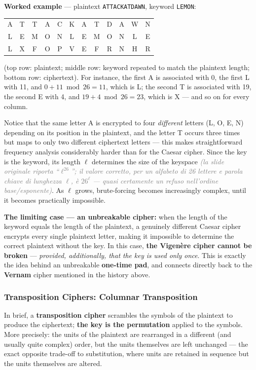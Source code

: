 \documentclass[12pt, a4paper]{article}
\begin{document}
\textbf{Worked example} --- plaintext \texttt{ATTACKATDAWN}, keyword \texttt{LEMON}:
\begin{center}
\begin{tabular}{@{}cccccccccccc@{}}
\toprule
A & T & T & A & C & K & A & T & D & A & W & N \\
L & E & M & O & N & L & E & M & O & N & L & E \\
\midrule
L & X & F & O & P & V & E & F & R & N & H & R \\
\bottomrule
\end{tabular}
\end{center}
(top row: plaintext; middle row: keyword repeated to match the plaintext length; bottom row: ciphertext). For instance, the first A is associated with 0, the first L with 11, and $0+11 \bmod 26 = 11$, which is L; the second T is associated with 19, the second E with 4, and $19+4 \bmod 26 = 23$, which is X — and so on for every column.

Notice that the same letter A is encrypted to four \emph{different} letters (L, O, E, N) depending on its position in the plaintext, and the letter T occurs three times but maps to only two different ciphertext letters — this makes straightforward frequency analysis considerably harder than for the Caesar cipher. Since the key is the keyword, its length $\ell$ determines the size of the keyspace \textcolor{gray}{\textit{(la slide originale riporta ``$\ell^{26}$''; il valore corretto, per un alfabeto di 26 lettere e parola chiave di lunghezza $\ell$, è $26^{\ell}$ --- quasi certamente un refuso nell'ordine base/esponente)}}. As $\ell$ grows, brute-forcing becomes increasingly complex, until it becomes practically impossible.

\textbf{The limiting case --- an unbreakable cipher:} when the length of the keyword equals the length of the plaintext, a genuinely different Caesar cipher encrypts every single plaintext letter, making it impossible to determine the correct plaintext without the key. In this case, \textbf{the Vigenère cipher cannot be broken} --- \emph{provided, additionally, that the key is used only once}. This is exactly the idea behind an unbreakable \textbf{one-time pad}, and connects directly back to the \textbf{Vernam} cipher mentioned in the history above.

\subsubsection{Transposition Ciphers: Columnar Transposition}
In brief, a \textbf{transposition cipher} scrambles the symbols of the plaintext to produce the ciphertext; \textbf{the key is the permutation} applied to the symbols. More precisely: the units of the plaintext are rearranged in a different (and usually quite complex) order, but the units themselves are left unchanged --- the exact opposite trade-off to substitution, where units are retained in sequence but the units themselves are altered.
\end{document}
